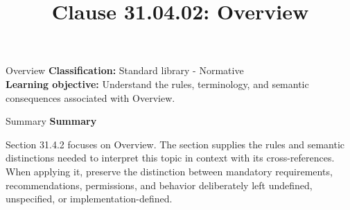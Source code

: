 \documentclass[10pt,letterpaper]{article}
\title{Clause 31.04.02: Overview}
\author{}
\date{}
\begin{document}
\maketitle
\begin{CornellOverviewBox}{Overview}
\textbf{Classification:} Standard library - Normative\\[2pt]
\textbf{Learning objective:} Understand the rules, terminology, and semantic consequences associated with Overview.
\end{CornellOverviewBox}\begin{CornellSummaryBox}{Summary}
{\sffamily\bfseries\color{Accent} Summary}\par\vspace{3pt}Section 31.4.2 focuses on Overview. The section supplies the rules and semantic distinctions needed to interpret this topic in context with its cross-references. When applying it, preserve the distinction between mandatory requirements, recommendations, permissions, and behavior deliberately left undefined, unspecified, or implementation-defined.
\end{CornellSummaryBox}
\end{document}

